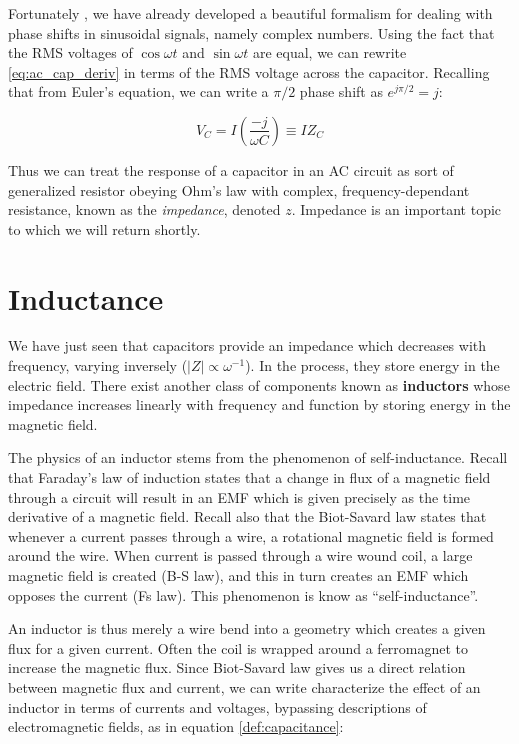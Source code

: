 \documentclass{tufte-book}
\begin{document}
Fortunately , we have already developed a beautiful formalism for dealing with phase shifts in sinusoidal signals, namely complex numbers. Using the fact that the RMS voltages of $\cos\omega t$ and $\sin\omega t$ are equal, we can rewrite \ref{eq:ac_cap_deriv} in terms of the RMS voltage across the capacitor. Recalling that from Euler's equation, we can write a $\pi/2$ phase shift as $e^{j\pi/2} = j$:

\begin{equation}\label{eq:cap_impedance}
V_C = I\left(\frac{-j}{\omega C}\right) \equiv IZ_C
\end{equation}

Thus we can treat the response of a capacitor in an AC circuit as sort of generalized resistor obeying Ohm's law with complex, frequency-dependant resistance, known as the \textit{impedance}, denoted $z$. Impedance is an important topic to which we will return shortly.

\section{Inductance}
We have just seen that capacitors provide an impedance which decreases with frequency, varying inversely ($\vert Z \vert \propto \omega^{-1}$). In the process, they store energy in the electric field. There exist another class of components known as \textbf{inductors} whose impedance increases linearly with frequency and function by storing energy in the magnetic field.

The physics of an inductor stems from the phenomenon of self-inductance. Recall that Faraday's law of induction states that a change in flux of a magnetic field through a circuit will result in an EMF which is given precisely as the time derivative of a magnetic field. Recall also that the Biot-Savard law states that whenever a current passes through a wire, a rotational magnetic field is formed around the wire. When current is passed through a wire wound coil, a large magnetic field is created (B-S law), and this in turn creates an EMF which opposes the current (Fs law). This phenomenon is know as ``self-inductance''.

An inductor is thus merely a wire bend into a geometry which creates a given flux for a given current. Often the coil is wrapped around a ferromagnet to increase the magnetic flux. Since Biot-Savard law gives us a direct relation between magnetic flux and current, we can write characterize the effect of an inductor in terms of currents and voltages, bypassing descriptions of electromagnetic fields, as in equation \ref{def:capacitance}:
\end{document}
